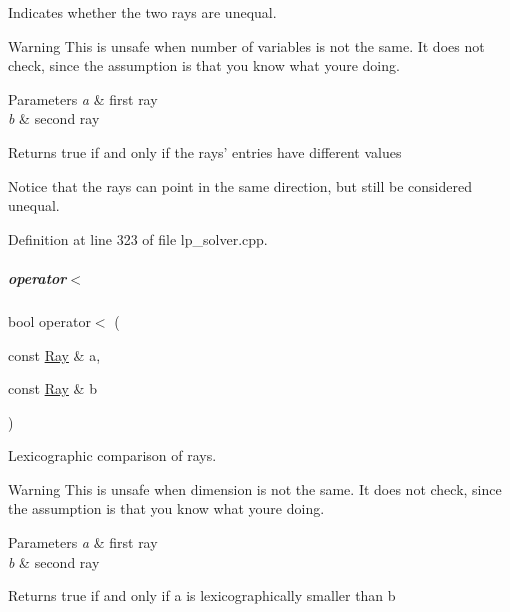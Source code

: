 Indicates whether the two rays are unequal. 

\begin{DoxyWarning}{Warning}
This is unsafe when number of variables is not the same. It does not check, since the assumption is that you know what you\textquotesingle{}re doing. 
\end{DoxyWarning}

\begin{DoxyParams}{Parameters}
{\em a} & first ray \\
\hline
{\em b} & second ray \\
\hline
\end{DoxyParams}
\begin{DoxyReturn}{Returns}
{\ttfamily true} if and only if the rays' entries have different values
\end{DoxyReturn}
Notice that the rays can point in the same direction, but still be considered unequal. 

Definition at line 323 of file lp\+\_\+solver.\+cpp.

\mbox{\label{group___c_l_s_solvers_a4c3d0a1adb5408b59013e6533e144b98}} 
\subparagraph{\texorpdfstring{operator$<$}{operator<}}
{\footnotesize\ttfamily bool operator$<$ (\begin{DoxyParamCaption}\item[{const \hyperlink{group___c_l_s_solvers_class_l_p___solvers_1_1_ray}{Ray} \&}]{a,  }\item[{const \hyperlink{group___c_l_s_solvers_class_l_p___solvers_1_1_ray}{Ray} \&}]{b }\end{DoxyParamCaption})\hspace{0.3cm}{\ttfamily [friend]}}



Lexicographic comparison of rays. 

\begin{DoxyWarning}{Warning}
This is unsafe when dimension is not the same. It does not check, since the assumption is that you know what you\textquotesingle{}re doing. 
\end{DoxyWarning}

\begin{DoxyParams}{Parameters}
{\em a} & first ray \\
\hline
{\em b} & second ray \\
\hline
\end{DoxyParams}
\begin{DoxyReturn}{Returns}
{\ttfamily true} if and only if {\ttfamily a} is lexicographically smaller than {\ttfamily b} 
\end{DoxyReturn}


